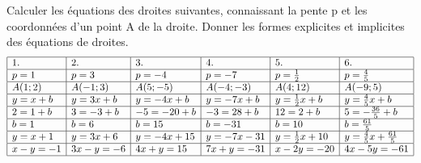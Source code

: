\begin{solution}

\end{solution}

\begin{landscape}

\begin{solution}
Calculer les équations des droites suivantes, connaissant la pente p et les coordonnées d'un point A de la droite. Donner les formes explicites et implicites des équations de droites.
$$
\begin{array}{|l|l|l|l|l|l|}
\hline
1.          & 2.           & 3.            & 4.            & 5.                   & 6.                                \\ \hline
p = 1       & p = 3        & p =-4       & p =-7       & p=\frac{1}{2}     & p=\frac{4}{5}                  \\ \hline
A(1 ;2)     & A(- 1 ;3)    & A(5 ;-5)    & A(- 4 ;- 3)   & A(4 ;12)             & A(- 9 ;5)                         \\ \hline
y = x+b     & y = 3x + b   & y =-4x + b  & y =-7 x + b & y=\frac{1}{2}x+b  & y=\frac{4}{5}x+b               \\ \hline
2 = 1 + b   & 3 =-3 + b  & -5 =-20 + b &-3 = 28 + b  & 12 = 2 + b           & 5=-\frac{36}{5}+b              \\ \hline
b = 1       & b = 6        & b = 15        & b = -31       & b = 10               & b=\frac{61}{5}                 \\ \hline
y = x + 1   & y = 3x + 6   & y =-4x + 15 & y = -7 x-31 & y=\frac{1}{2}x+10 & y=\frac{4}{5}x+\frac{61}{5} \\ \hline
x-y =-1 & 3x-y =-6 & 4x + y = 15   & 7x + y =-31 & x-2y =-20        & 4x-5y =-61                    \\ \hline
\end{array}
$$


\end{solution}
\end{landscape}
